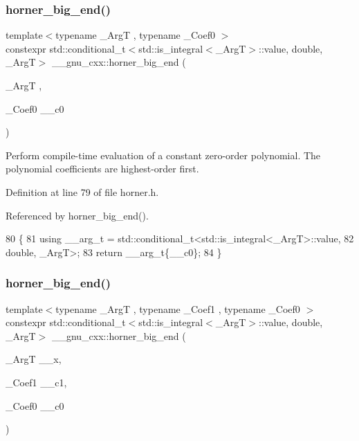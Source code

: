 \subsubsection{\texorpdfstring{horner\+\_\+big\+\_\+end()}{horner\_big\_end()}\hspace{0.1cm}{\footnotesize\ttfamily [1/3]}}
{\footnotesize\ttfamily template$<$typename \+\_\+\+ArgT , typename \+\_\+\+Coef0 $>$ \\
constexpr std\+::conditional\+\_\+t$<$std\+::is\+\_\+integral$<$\+\_\+\+ArgT$>$\+::value, double, \+\_\+\+ArgT$>$ \+\_\+\+\_\+gnu\+\_\+cxx\+::horner\+\_\+big\+\_\+end (\begin{DoxyParamCaption}\item[{\+\_\+\+ArgT}]{,  }\item[{\+\_\+\+Coef0}]{\+\_\+\+\_\+c0 }\end{DoxyParamCaption})}

Perform compile-\/time evaluation of a constant zero-\/order polynomial. The polynomial coefficients are highest-\/order first. 

Definition at line 79 of file horner.\+h.



Referenced by horner\+\_\+big\+\_\+end().


\begin{DoxyCode}
80   \{
81     \textcolor{keyword}{using} \_\_arg\_t = std::conditional\_t<std::is\_integral<\_ArgT>::value,
82                                         double, \_ArgT>;
83     \textcolor{keywordflow}{return} \_\_arg\_t\{\_\_c0\};
84   \}
\end{DoxyCode}
\mbox{\label{namespace____gnu__cxx_a546a72f007105e3ba32df87d7463edf7}} 
\subsubsection{\texorpdfstring{horner\+\_\+big\+\_\+end()}{horner\_big\_end()}\hspace{0.1cm}{\footnotesize\ttfamily [2/3]}}
{\footnotesize\ttfamily template$<$typename \+\_\+\+ArgT , typename \+\_\+\+Coef1 , typename \+\_\+\+Coef0 $>$ \\
constexpr std\+::conditional\+\_\+t$<$std\+::is\+\_\+integral$<$\+\_\+\+ArgT$>$\+::value, double, \+\_\+\+ArgT$>$ \+\_\+\+\_\+gnu\+\_\+cxx\+::horner\+\_\+big\+\_\+end (\begin{DoxyParamCaption}\item[{\+\_\+\+ArgT}]{\+\_\+\+\_\+x,  }\item[{\+\_\+\+Coef1}]{\+\_\+\+\_\+c1,  }\item[{\+\_\+\+Coef0}]{\+\_\+\+\_\+c0 }\end{DoxyParamCaption})}

